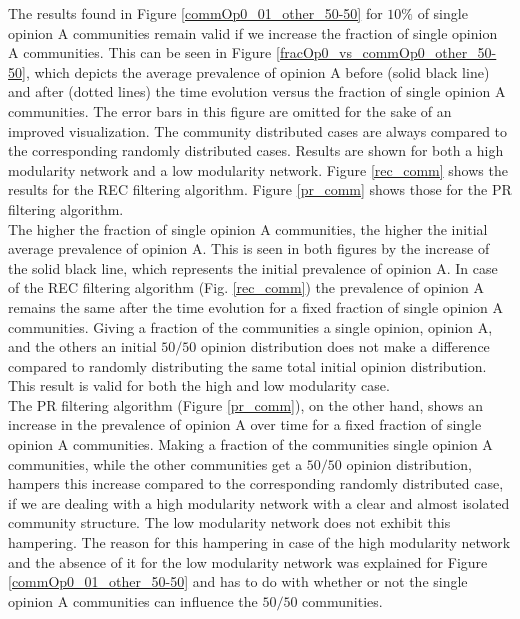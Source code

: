 \documentclass[11 pt , letterpaper , twoside , openright]{book}
\begin{document}
\noindent
The results found in Figure \ref{commOp0_01_other_50-50} for $10 \%$ of single opinion A communities remain valid if we increase the fraction of single opinion A communities. This can be seen in Figure \ref{fracOp0_vs_commOp0_other_50-50}, which depicts the average prevalence of opinion A before (solid black line) and after (dotted lines) the time evolution versus the fraction of single opinion A communities. The error bars in this figure are omitted for the sake of an improved visualization. The community distributed cases are always compared to the corresponding randomly distributed cases. Results are shown for both a high modularity network and a low modularity network. Figure \ref{rec_comm} shows the results for the REC filtering algorithm. Figure \ref{pr_comm} shows those for the PR filtering algorithm.\\
\newline
The higher the fraction of single opinion A communities, the higher the initial average prevalence of opinion A. This is seen in both figures by the increase of the solid black line, which represents the initial prevalence of opinion A. In case of the REC filtering algorithm (Fig. \ref{rec_comm}) the prevalence of opinion A remains the same after the time evolution for a fixed fraction of single opinion A communities. Giving a fraction of the communities a single opinion, opinion A, and the others an initial $50/50$ opinion distribution does not make a difference compared to randomly distributing the same total initial opinion distribution. This result is valid for both the high and low modularity case.\\
\newline
The PR filtering algorithm (Figure \ref{pr_comm}), on the other hand, shows an increase in the prevalence of opinion A over time for a fixed fraction of single opinion A communities. Making a fraction of the communities single opinion A communities, while the other communities get a $50/50$ opinion distribution, hampers this increase compared to the corresponding randomly distributed case, if we are dealing with a high modularity network with a clear and almost isolated community structure. The low modularity network does not exhibit this hampering. The reason for this hampering in case of the high modularity network and the absence of it for the low modularity network was explained for Figure \ref{commOp0_01_other_50-50} and has to do with whether or not the single opinion A communities can influence the $50/50$ communities. 
\end{document}

